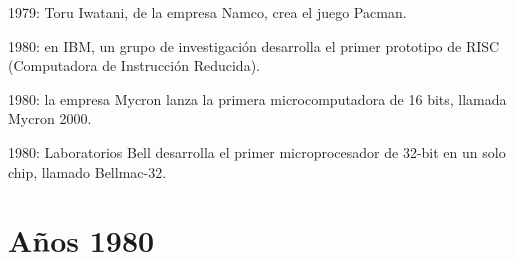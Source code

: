 \documentclass{article}
\begin{document}
{    %
    \item 1979: Toru Iwatani, de la empresa Namco, crea el juego Pacman.
    \item 1980: en IBM, un grupo de investigación desarrolla el primer prototipo de RISC (Computadora de Instrucción Reducida).
    \item 1980: la empresa Mycron lanza la primera microcomputadora de 16 bits, llamada Mycron 2000.
    \item 1980: Laboratorios Bell desarrolla el primer microprocesador de 32-bit en un solo chip, llamado Bellmac-32.

}

\section{Años 1980}
\end{document}
